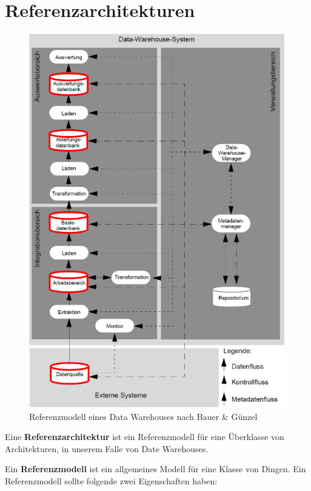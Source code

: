 \documentclass[a4paper, 11pt, nofootinbib]{article}
\begin{document}
\section{Referenzarchitekturen}
\begin{figure}
	\centering
	\includegraphics[keepaspectratio=true,height=18\baselineskip]{refModell.png}
	\caption{Referenzmodell eines Data Warehouses nach Bauer \& Günzel}
	\label{fig:refModel}
\end{figure}


Eine \textbf{Referenzarchitektur} ist ein Referenzmodell für eine Überklasse von Architekturen, in unserem Falle von Date Warehouses.

Ein \textbf{Referenzmodell} ist ein allgemeines Modell für eine Klasse von Dingen. Ein Referenzmodell sollte folgende zwei Eigenschaften haben:
\end{document}
